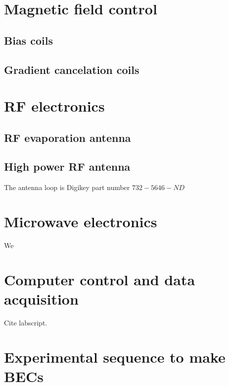 \section{Magnetic field control}
\subsection{Bias coils}
\subsection{Gradient cancelation coils}

\section{RF electronics}
\subsection{RF evaporation antenna}
\subsection{High power RF antenna}
\label{sec:high_power_rf_antenna}
The antenna loop is Digikey part number $732-5646-ND$

\section{Microwave electronics}

We


\section{Computer control and data acquisition}
Cite labscript. 
\section{Experimental sequence to make BECs}
\label{sec:making-becs}











